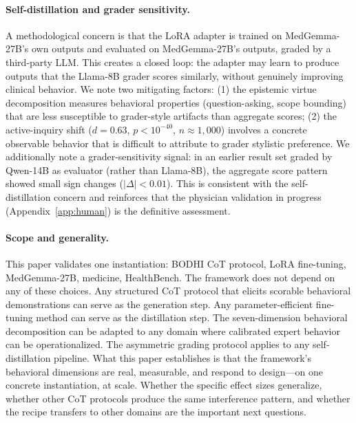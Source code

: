\documentclass{article}
\newcommand{\bodhi}{BODHI}
\begin{document}
\paragraph{Self-distillation and grader sensitivity.} A methodological concern is that the LoRA adapter is trained on MedGemma-27B's own outputs and evaluated on MedGemma-27B's outputs, graded by a third-party LLM. This creates a closed loop: the adapter may learn to produce outputs that the Llama-8B grader scores similarly, without genuinely improving clinical behavior. We note two mitigating factors: (1) the epistemic virtue decomposition measures behavioral properties (question-asking, scope bounding) that are less susceptible to grader-style artifacts than aggregate scores; (2) the active-inquiry shift ($d=0.63$, $p<10^{-40}$, $n\approx1{,}000$) involves a concrete observable behavior that is difficult to attribute to grader stylistic preference. We additionally note a grader-sensitivity signal: in an earlier result set graded by Qwen-14B as evaluator (rather than Llama-8B), the aggregate score pattern showed small sign changes ($|\Delta|<0.01$). This is consistent with the self-distillation concern and reinforces that the physician validation in progress (Appendix~\ref{app:human}) is the definitive assessment.

\paragraph{Scope and generality.} This paper validates one instantiation: \bodhi{} CoT protocol, LoRA fine-tuning, MedGemma-27B, medicine, HealthBench. The framework does not depend on any of these choices. Any structured CoT protocol that elicits scorable behavioral demonstrations can serve as the generation step. Any parameter-efficient fine-tuning method can serve as the distillation step. The seven-dimension behavioral decomposition can be adapted to any domain where calibrated expert behavior can be operationalized. The asymmetric grading protocol applies to any self-distillation pipeline. What this paper establishes is that the framework's behavioral dimensions are real, measurable, and respond to design---on one concrete instantiation, at scale. Whether the specific effect sizes generalize, whether other CoT protocols produce the same interference pattern, and whether the recipe transfers to other domains are the important next questions.
\end{document}
